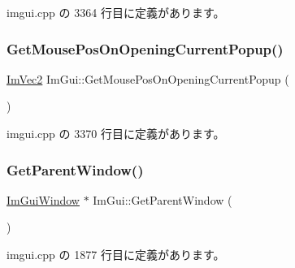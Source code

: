 imgui.\+cpp の 3364 行目に定義があります。

\mbox{\label{namespace_im_gui_ac1ba5d7b76e11d47660b32dc851afd2f}} 
\subsubsection{\texorpdfstring{Get\+Mouse\+Pos\+On\+Opening\+Current\+Popup()}{GetMousePosOnOpeningCurrentPopup()}}
{\footnotesize\ttfamily \mbox{\hyperlink{struct_im_vec2}{Im\+Vec2}} Im\+Gui\+::\+Get\+Mouse\+Pos\+On\+Opening\+Current\+Popup (\begin{DoxyParamCaption}{ }\end{DoxyParamCaption})}



 imgui.\+cpp の 3370 行目に定義があります。

\mbox{\label{namespace_im_gui_afd2f3d9a23ef5cb331d060a0d77e2cde}} 
\subsubsection{\texorpdfstring{Get\+Parent\+Window()}{GetParentWindow()}}
{\footnotesize\ttfamily \mbox{\hyperlink{struct_im_gui_window}{Im\+Gui\+Window}} $\ast$ Im\+Gui\+::\+Get\+Parent\+Window (\begin{DoxyParamCaption}{ }\end{DoxyParamCaption})}



 imgui.\+cpp の 1877 行目に定義があります。

